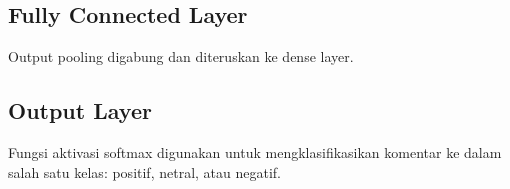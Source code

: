 \subsection{Fully Connected Layer}
Output pooling digabung dan diteruskan ke dense layer.

\subsection{Output Layer}
Fungsi aktivasi softmax digunakan untuk mengklasifikasikan komentar ke dalam salah satu kelas: positif, netral, atau negatif.

